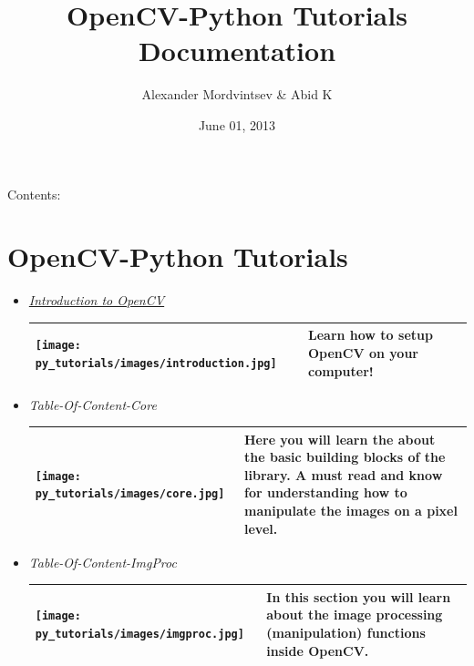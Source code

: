 \documentclass[letterpaper,10pt,english]{sphinxmanual}
\title{OpenCV-Python Tutorials Documentation}
\date{June 01, 2013}
\author{Alexander Mordvintsev \& Abid K}
\begin{document}
\maketitle
\tableofcontents
{}\label{index::doc}


Contents:


\chapter{OpenCV-Python Tutorials}
\label{py_tutorials/py_tutorials:opencv-python-tutorials}\label{py_tutorials/py_tutorials::doc}\label{py_tutorials/py_tutorials:welcome-to-opencv-python-tutorials-s-documentation}\begin{itemize}
\item {} 
{\hyperref[py_tutorials/py_setup/py_table_of_contents_setup/py_table_of_contents_setup:table-of-content-setup]{\emph{Introduction to OpenCV}}}

\begin{tabulary}{\linewidth}{m{100pt} m{300pt}}
\hline

\texttt{[image: py\_tutorials/images/introduction.jpg]}
 & 
Learn how to setup OpenCV on your computer!
\\\hline
\end{tabulary}


\item {} 
\emph{Table-Of-Content-Core}

\begin{tabulary}{\linewidth}{m{100pt} m{300pt}}
\hline

\texttt{[image: py\_tutorials/images/core.jpg]}
 & 
Here you will learn the about the basic building blocks of the library. A must read and know for     understanding how to manipulate the images on a pixel level.
\\\hline
\end{tabulary}


\item {} 
\emph{Table-Of-Content-ImgProc}

\begin{tabulary}{\linewidth}{m{100pt} m{300pt}}
\hline

\texttt{[image: py\_tutorials/images/imgproc.jpg]}
 & 
In this section you will learn about the image processing (manipulation) functions inside OpenCV.
\\\hline
\end{tabulary}


\end{itemize}
\pagebreak
\end{document}
